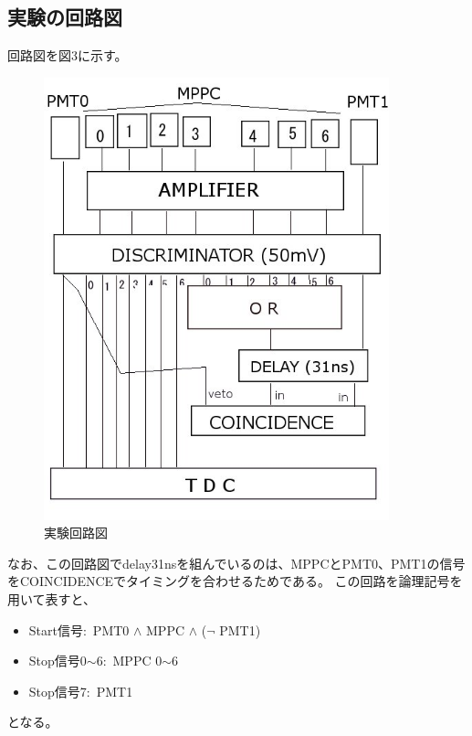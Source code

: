 \subsection{実験の回路図}
回路図を図3に示す。
\begin{figure}[H]
  \centering
  \includegraphics[width=100mm, bb=0 0 500 640]{kairo2.jpg}
  \caption{実験回路図}
\end{figure}
なお、この回路図でdelay31nsを組んでいるのは、MPPCとPMT0、PMT1の信号をCOINCIDENCEでタイミングを合わせるためである。
この回路を論理記号を用いて表すと、
\begin{itemize}
  \item Start信号:\ PMT0 $\land$ MPPC $\land$ ($\lnot$ PMT1)
  \item Stop信号0$\sim$6:\  MPPC 0$\sim$6
  \item Stop信号7:\ PMT1
\end{itemize}
となる。

